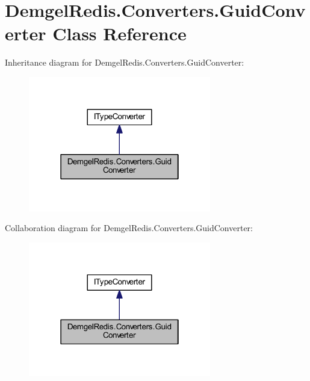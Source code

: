 \hypertarget{class_demgel_redis_1_1_converters_1_1_guid_converter}{}\section{Demgel\+Redis.\+Converters.\+Guid\+Converter Class Reference}
\label{class_demgel_redis_1_1_converters_1_1_guid_converter}


Inheritance diagram for Demgel\+Redis.\+Converters.\+Guid\+Converter\+:
\nopagebreak
\begin{figure}[H]
\begin{center}
\leavevmode
\includegraphics[width=226pt]{class_demgel_redis_1_1_converters_1_1_guid_converter__inherit__graph}
\end{center}
\end{figure}


Collaboration diagram for Demgel\+Redis.\+Converters.\+Guid\+Converter\+:
\nopagebreak
\begin{figure}[H]
\begin{center}
\leavevmode
\includegraphics[width=226pt]{class_demgel_redis_1_1_converters_1_1_guid_converter__coll__graph}
\end{center}
\end{figure}
